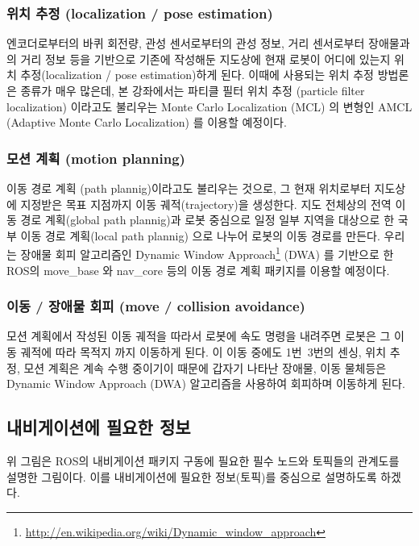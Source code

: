 \subsubsection{위치 추정 (localization / pose estimation)}
엔코더로부터의 바퀴 회전량, 관성 센서로부터의 관성 정보, 거리 센서로부터 장애물과의 거리 정보 등을 기반으로 기존에 작성해둔 지도상에 현재 로봇이 어디에 있는지 위치 추정(localization / pose estimation)하게 된다. 이때에 사용되는 위치 추정 방법론은 종류가 매우 많은데, 본 강좌에서는 파티클 필터 위치 추정 (particle filter localization) 이라고도 불리우는 Monte Carlo Localization (MCL) 의 변형인 AMCL (Adaptive Monte Carlo Localization)\cite{thrun2005probabilistic} 를 이용할 예정이다.

\subsubsection{모션 계획 (motion planning)}
이동 경로 계획 (path plannig)이라고도 불리우는 것으로, 그 현재 위치로부터 지도상에 지정받은 목표 지점까지 이동 궤적(trajectory)을 생성한다. 지도 전체상의 전역 이동 경로 계획(global path plannig)과 로봇 중심으로 일정 일부 지역을 대상으로 한 국부 이동 경로 계획(local path plannig) 으로 나누어 로봇의 이동 경로를 만든다. 우리는 장애물 회피 알고리즘인 Dynamic Window Approach\footnote{\url{http://en.wikipedia.org/wiki/Dynamic_window_approach}} (DWA) 를 기반으로 한 ROS의 move\_base 와 nav\_core 등의 이동 경로 계획 패키지를 이용할 예정이다.

\subsubsection{이동 / 장애물 회피 (move / collision avoidance)}
모션 계획에서 작성된 이동 궤적을 따라서 로봇에 속도 명령을 내려주면 로봇은 그 이동 궤적에 따라 목적지 까지 이동하게 된다. 이 이동 중에도 1번~3번의 센싱, 위치 추정, 모션 계획은 계속 수행 중이기이 때문에 갑자기 나타난 장애물, 이동 물체등은 Dynamic Window Approach (DWA) 알고리즘을 사용하여 회피하며 이동하게 된다.

\subsection{내비게이션에 필요한 정보}

위 그림은 ROS의 내비게이션 패키지 구동에 필요한 필수 노드와 토픽들의 관계도를 설명한 그림이다. 이를 내비게이션에 필요한 정보(토픽)를 중심으로 설명하도록 하겠다.

